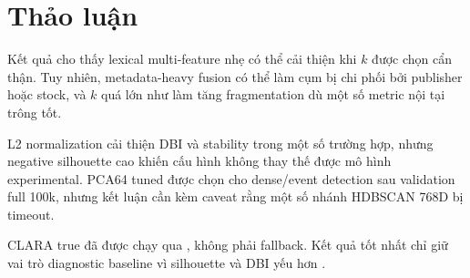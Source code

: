 \section{Thảo luận}

Kết quả cho thấy lexical multi-feature nhẹ có thể cải thiện  khi \(k\) được chọn cẩn thận. Tuy nhiên, metadata-heavy fusion có thể làm cụm bị chi phối bởi publisher hoặc stock, và \(k\) quá lớn như  làm tăng fragmentation dù một số metric nội tại trông tốt.

L2 normalization cải thiện DBI và stability trong một số trường hợp, nhưng negative silhouette cao khiến cấu hình  không thay thế được mô hình experimental. PCA64 tuned  được chọn cho dense/event detection sau validation full 100k, nhưng kết luận cần kèm caveat rằng một số nhánh HDBSCAN 768D bị timeout.

CLARA true đã được chạy qua , không phải fallback. Kết quả tốt nhất chỉ giữ vai trò diagnostic baseline vì silhouette và DBI yếu hơn .
